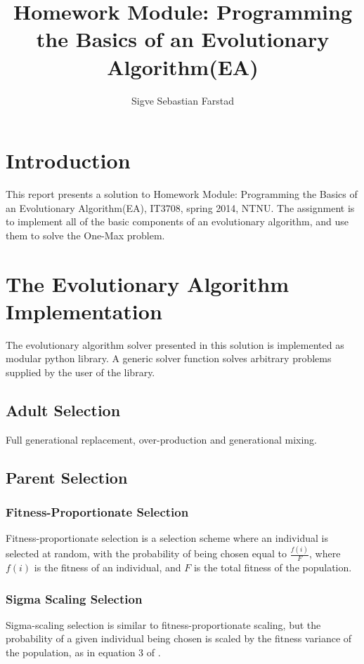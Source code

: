\documentclass{article}
\title{Homework Module: \textbf{Programming the Basics of an Evolutionary Algorithm(EA)}}
\author{Sigve Sebastian Farstad}
\begin{document}
\maketitle

\section{Introduction}

This report presents a solution to Homework Module: Programming the Basics of an Evolutionary Algorithm(EA), IT3708, spring 2014, NTNU.
The assignment is to implement all of the basic components of an evolutionary algorithm, and use them to solve the One-Max problem.

\section{The Evolutionary Algorithm Implementation}

The evolutionary algorithm solver presented in this solution is implemented as modular python library.
A generic solver function solves arbitrary problems supplied by the user of the library.

\subsection{Adult Selection}
Full generational replacement, over-production and generational mixing.
\subsection{Parent Selection}
\subsubsection{Fitness-Proportionate Selection}
Fitness-proportionate selection is a selection scheme where an individual is selected at random, with the probability of being chosen equal to $ \frac{f(i)}{F} $, where $ f(i) $ is the fitness of an individual, and $ F $ is the total fitness of the population.

\subsubsection{Sigma Scaling Selection}
Sigma-scaling selection is similar to fitness-proportionate scaling, but the probability of a given individual being chosen is scaled by the fitness variance of the population, as in equation 3 of \cite{ea-appendices}.
\end{document}
